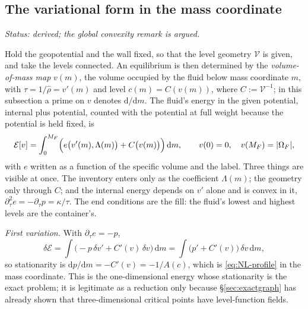 \documentclass[11pt]{article}
\theoremstyle{definition}
\theoremstyle{remark}
\newcommand{\Vol}{\mathcal V}
\newcommand{\status}[1]{\noindent\emph{Status: #1}\par\smallskip}
\begin{document}
\subsection{The variational form in the mass coordinate}
\label{sec:NL-variational}

\status{derived; the global convexity remark is argued.}

Hold the geopotential and the wall fixed, so that the level geometry
$\Vol$ is given, and take the levels connected. An equilibrium is then
determined by the \emph{volume-of-mass map} $v(m)$, the volume occupied
by the fluid below mass coordinate $m$, with $\tau = 1/\hat\rho =
v'(m)$ and level $c(m) = C(v(m))$, where $C := \Vol^{-1}$; in this
subsection a prime on $v$ denotes $\mathrm d/\mathrm dm$. The fluid's
energy in the given potential, internal plus potential, counted with
the potential at full weight because the potential is held fixed, is
\begin{equation}
  \mathcal E[v] = \int_0^{M_F}\Bigl(e\bigl(v'(m), \Lambda(m)\bigr)
  + C\bigl(v(m)\bigr)\Bigr)\,\mathrm dm,\qquad
  v(0) = 0,\quad v(M_F) = |\Omega_F| ,
  \label{eq:Ev}
\end{equation}
with $e$ written as a function of the specific volume and the label.
Three things are visible at once. The inventory enters only as the
coefficient $\Lambda(m)$; the geometry only through $C$; and the
internal energy depends on $v'$ alone and is convex in it,
$\partial_\tau^2e = -\partial_\tau p = \kappa/\tau$. The end conditions
are the fill: the fluid's lowest and highest levels are the
container's.

\emph{First variation.} With $\partial_\tau e = -p$,
\begin{equation*}
  \delta\mathcal E = \int\bigl(-p\,\delta v' + C'(v)\,\delta v\bigr)\,\mathrm dm
  = \int\bigl(p' + C'(v)\bigr)\,\delta v\,\mathrm dm ,
\end{equation*}
so stationarity is $\mathrm dp/\mathrm dm = -C'(v) = -1/A(c)$, which is
\eqref{eq:NL-profile} in the mass coordinate. This is the
one-dimensional energy whose stationarity is the exact problem; it is
legitimate as a reduction only because \S\ref{sec:exactgraph} has
already shown that three-dimensional critical points have
level-function fields.
\end{document}
